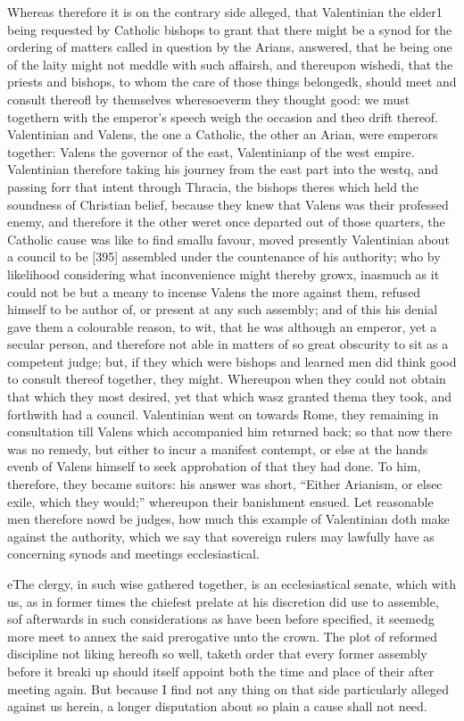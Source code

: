 Whereas therefore it is on the contrary side alleged, that Valentinian the elder1 being requested by Catholic bishops to grant that there might be a synod for the ordering of matters called in question by the Arians, answered, that he being one of the laity might not meddle with such affairsh, and thereupon wishedi, that the priests and bishops, to whom the care of those things belongedk, should meet and consult thereofl by themselves wheresoeverm they thought good: we must togethern with the emperor’s speech weigh the occasion and theo drift thereof. Valentinian and Valens, the one a Catholic, the other an Arian, were emperors together: Valens the governor of the east, Valentinianp of the west empire. Valentinian therefore taking his journey from the east part into the westq, and passing forr that intent through Thracia, the bishops theres which held the soundness of Christian belief, because they knew that Valens was their professed enemy, and therefore it the other weret once departed out of those quarters, the Catholic cause was like to find smallu favour, moved presently Valentinian about a council to be [395] assembled under the countenance of his authority; who by likelihood considering what inconvenience might thereby growx, inasmuch as it could not be but a meany to incense Valens the more against them, refused himself to be author of, or present at any such assembly; and of this his denial gave them a colourable reason, to wit, that he was although an emperor, yet a secular person, and therefore not able in matters of so great obscurity to sit as a competent judge; but, if they which were bishops and learned men did think good to consult thereof together, they might. Whereupon when they could not obtain that which they most desired, yet that which wasz granted thema they took, and forthwith had a council. Valentinian went on towards Rome, they remaining in consultation till Valens which accompanied him returned back; so that now there was no remedy, but either to incur a manifest contempt, or else at the hands evenb of Valens himself to seek approbation of that they had done. To him, therefore, they became suitors: his answer was short, “Either Arianism, or elsec exile, which they would;” whereupon their banishment ensued. Let reasonable men therefore nowd be judges, how much this example of Valentinian doth make against the authority, which we say that sovereign rulers may lawfully have as concerning synods and meetings ecclesiastical.

eThe clergy, in such wise gathered together, is an ecclesiastical senate, which with us, as in former times the chiefest prelate at his discretion did use to assemble, sof afterwards in such considerations as have been before specified, it seemedg more meet to annex the said prerogative unto the crown. The plot of reformed discipline not liking hereofh so well, taketh order that every former assembly before it breaki up should itself appoint both the time and place of their after meeting again. But because I find not any thing on that side particularly alleged against us herein, a longer disputation about so plain a cause shall not need.

